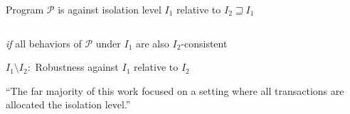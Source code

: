 
\begin{frame}{}
	\begin{center}
	\end{center}
\end{frame}

\begin{frame}{}
	\begin{center}
		Program $\mathcal{P}$ is 
		against isolation level $I_{1}$ relative to $I_{2} \sqsupseteq I_{1}$

		\begin{columns}
		\end{columns}

		\vspace{0.60cm}
		{\it if} all behaviors of $\mathcal{P}$ under $I_{1}$
		are also $I_{2}$-consistent
	\end{center}
\end{frame}



\begin{frame}{}
	\begin{center}
    $I_{1} \setminus I_{2}:$ Robustness against $I_{1}$ relative to $I_{2}$

		\vspace{-0.30cm}
		

		\vspace{0.10cm}
		``The far majority of this work focused on
			a  setting
			where all transactions are allocated
			the  isolation level.''
	\end{center}
\end{frame}



